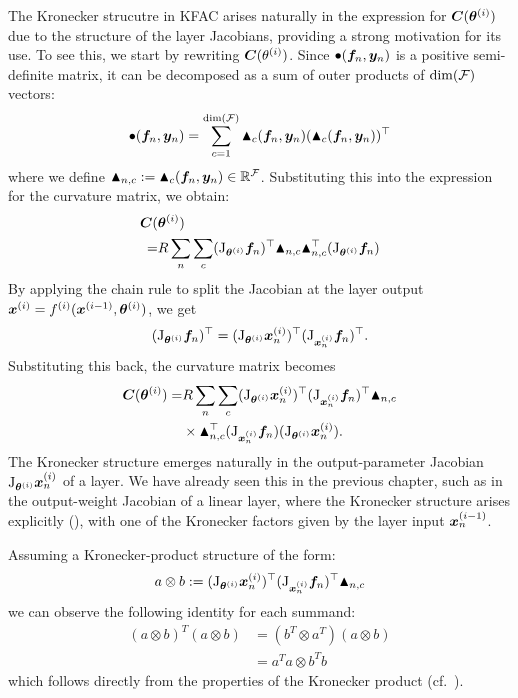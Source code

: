 The Kronecker strucutre in KFAC arises naturally in the expression for ${\bm{C}}({\bm{\theta}}^{(i)})$ due to the structure of the layer Jacobians, providing a strong motivation for its use.
To see this, we start by rewriting ${\bm{C}}(\theta^{(i)})$.
Since $\bullet({\bm{f}}_n, {\bm{y}}_n)$ is a positive semi-definite matrix, it can be decomposed as a sum of outer products of $\dim({\mathcal{F}})$ vectors: $$\bullet({\bm{f}}_n, {\bm{y}}_n) = \sum_{c=1}^{\dim({\mathcal{F}})} \blacktriangle_c({\bm{f}}_n, {\bm{y}}_n) (\blacktriangle_c({\bm{f}}_n, {\bm{y}}_n))^{\top}$$
where we define $\blacktriangle_{n,c} := \blacktriangle_c({\bm{f}}_n, {\bm{y}}_n) \in {\mathbb{R}}^{{\mathcal{F}}}$.
Substituting this into the expression for the curvature matrix, we obtain:
\begin{align*}
  {\bm{C}}(&{\bm{\theta}}^{(i)}) \\
  =&
  R \sum_n \sum_{c}
  (\mathrm{J}_{{\bm{\theta}}^{(i)}} {\bm{f}}_n)^{\top}
  \blacktriangle_{n,c} \blacktriangle_{n,c}^{\top}
  (\mathrm{J}_{{\bm{\theta}}^{(i)}} {\bm{f}}_n)
\end{align*}
By applying the chain rule to split the Jacobian at the layer output ${\bm{x}}^{(i)} = f^{(i)}({\bm{x}}^{(i-1)}, {\bm{\theta}}^{(i)})$, we get
\begin{align*}
  (\mathrm{J}_{{\bm{\theta}}^{(i)}} {\bm{f}}_n)^{\top}
  =
  (\mathrm{J}_{{\bm{\theta}}^{(i)}} {\bm{x}}^{(i)}_n)^{\top}
  (\mathrm{J}_{{\bm{x}}_n^{(i)}} {\bm{f}}_n)^{\top}.
\end{align*}
Substituting this back, the curvature matrix becomes
\begin{align*}
  {\bm{C}}({\bm{\theta}}^{(i)}) =& R \sum_n \sum_{c}
  (\mathrm{J}_{{\bm{\theta}}^{(i)}} {\bm{x}}^{(i)}_n)^{\top}
  (\mathrm{J}_{{\bm{x}}_n^{(i)}} {\bm{f}}_n)^{\top}
  \blacktriangle_{n,c} \\
  &\times \blacktriangle_{n,c}^{\top}
  (\mathrm{J}_{{\bm{x}}_n^{(i)}} {\bm{f}}_n)
  (\mathrm{J}_{{\bm{\theta}}^{(i)}} {\bm{x}}^{(i)}_n).
\end{align*}
The Kronecker structure emerges naturally in the output-parameter Jacobian $\mathrm{J}_{{\bm{\theta}}^{(i)}} {\bm{x}}_n^{(i)}$ of a layer.
We have already seen this in the previous chapter, such as in the output-weight Jacobian of a linear layer, where the Kronecker structure arises explicitly (), with one of the Kronecker factors given by the layer input ${\bm{x}}^{(i-1)}_n$.

Assuming a Kronecker-product structure of the form:
$$ a \otimes b := (\mathrm{J}_{{\bm{\theta}}^{(i)}} {\bm{x}}^{(i)}_n)^{\top}
(\mathrm{J}_{{\bm{x}}_n^{(i)}} {\bm{f}}_n)^{\top}
\blacktriangle_{n,c} $$
we can observe the following identity for each summand:
\begin{align*}
(a \otimes b)^T (a \otimes b) &= (b^T \otimes a^T)(a \otimes b) \\
&= a^Ta \otimes b^Tb
\end{align*}
which follows directly from the properties of the Kronecker product (cf.~).


